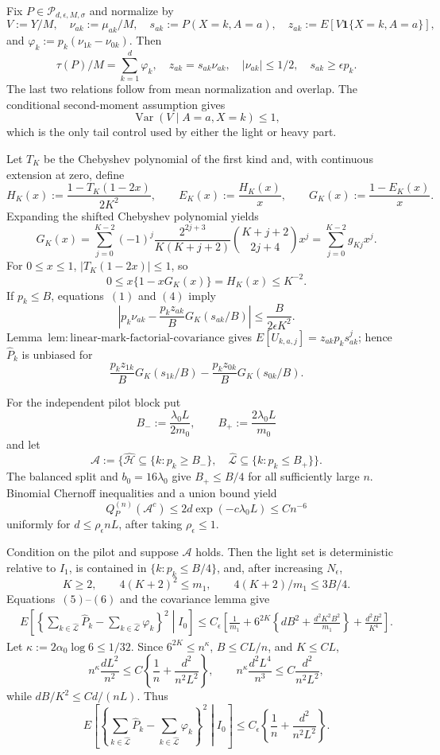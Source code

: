 Fix \(P\in\mathcal P_{d,\epsilon,M,\sigma}\) and normalize by
\[
 V:=Y/M,\quad \nu_{ak}:=\mu_{ak}/M,\quad
 s_{ak}:=P(X=k,A=a),\quad z_{ak}:=E[V\mathbf 1\{X=k,A=a\}],
\]
and \(\varphi_k:=p_k(\nu_{1k}-\nu_{0k})\).  Then
\[
 \tau(P)/M=\sum_{k=1}^d\varphi_k,
 \quad z_{ak}=s_{ak}\nu_{ak},
 \quad |\nu_{ak}|\le1/2,
 \quad s_{ak}\ge\epsilon p_k.
\tag{1}
\]
The last two relations follow from mean normalization and overlap.  The conditional second-moment assumption gives
\[
 \operatorname{Var}(V\mid A=a,X=k)\le1,
\tag{2}
\]
which is the only tail control used by either the light or heavy part.

Let \(T_K\) be the Chebyshev polynomial of the first kind and, with continuous extension at zero, define
\[
 H_K(x):=\frac{1-T_K(1-2x)}{2K^2},\qquad
 E_K(x):=\frac{H_K(x)}x,\qquad
 G_K(x):=\frac{1-E_K(x)}x.
\]
Expanding the shifted Chebyshev polynomial yields
\[
 G_K(x)=\sum_{j=0}^{K-2}(-1)^j
 \frac{2^{2j+3}}{K(K+j+2)}\binom{K+j+2}{2j+4}x^j
 =\sum_{j=0}^{K-2}g_{Kj}x^j.
\tag{3}
\]
For \(0\le x\le1\), \(|T_K(1-2x)|\le1\), so
\[
 0\le x\{1-xG_K(x)\}=H_K(x)\le K^{-2}.
\tag{4}
\]
If \(p_k\le B\), equations~\((1)\) and \((4)\) imply
\[
 \left|p_k\nu_{ak}-\frac{p_kz_{ak}}B G_K(s_{ak}/B)\right|
 \le\frac{B}{2\epsilon K^2}.
\tag{5}
\]
Lemma~\(\mathrm{lem:linear\text{-}mark\text{-}factorial\text{-}covariance}\) gives \(E[U_{k,a,j}]=z_{ak}p_ks_{ak}^j\); hence \(\widehat P_k\) is unbiased for
\[
 \frac{p_kz_{1k}}B G_K(s_{1k}/B)-
 \frac{p_kz_{0k}}B G_K(s_{0k}/B).
\tag{6}
\]

For the independent pilot block put
\[
 B_-:=\frac{\lambda_0L}{2m_0},\qquad B_+:=\frac{2\lambda_0L}{m_0}
\]
and let
\[
 \mathcal A:=\{\widehat{\mathcal H}\subseteq\{k:p_k\ge B_-\},\quad
 \widehat{\mathcal L}\subseteq\{k:p_k\le B_+\}\}.
\]
The balanced split and \(b_0=16\lambda_0\) give \(B_+\le B/4\) for all sufficiently large \(n\).  Binomial Chernoff inequalities and a union bound yield
\[
 Q_P^{(n)}(\mathcal A^c)\le2d\exp(-c\lambda_0L)\le Cn^{-6}
\tag{7}
\]
uniformly for \(d\le\rho_{\epsilon}nL\), after taking \(\rho_{\epsilon}\le1\).

Condition on the pilot and suppose \(\mathcal A\) holds.  Then the light set is deterministic relative to \(I_1\), is contained in \(\{k:p_k\le B/4\}\), and, after increasing \(N_{\epsilon}\),
\[
 K\ge2,\qquad4(K+2)^2\le m_1,
 \qquad4(K+2)/m_1\le3B/4.
\tag{8}
\]
Equations~\((5)\)--\((6)\) and the covariance lemma give
\[
\begin{split}
 E\left[\left\{\sum_{k\in\widehat{\mathcal L}}\widehat P_k-
 \sum_{k\in\widehat{\mathcal L}}\varphi_k\right\}^2\middle|I_0\right]
 \le C_{\epsilon}\left[\frac1{m_1}+6^{2K}\left\{dB^2+
 \frac{d^2K^2B^2}{m_1}\right\}+\frac{d^2B^2}{K^4}\right].
\end{split}
\tag{9}
\]
Let \(\kappa:=2\alpha_0\log6\le1/32\).  Since \(6^{2K}\le n^\kappa\), \(B\le CL/n\), and \(K\le CL\),
\[
 n^\kappa\frac{dL^2}{n^2}\le C\left\{\frac1n+\frac{d^2}{n^2L^2}\right\},
 \qquad
 n^\kappa\frac{d^2L^4}{n^3}\le C\frac{d^2}{n^2L^2},
\tag{10}
\]
while \(dB/K^2\le Cd/(nL)\).  Thus
\[
 E\left[\left\{\sum_{k\in\widehat{\mathcal L}}\widehat P_k-
 \sum_{k\in\widehat{\mathcal L}}\varphi_k\right\}^2\middle|I_0\right]
 \le C_{\epsilon}\left\{\frac1n+\frac{d^2}{n^2L^2}\right\}.
\tag{11}
\]

